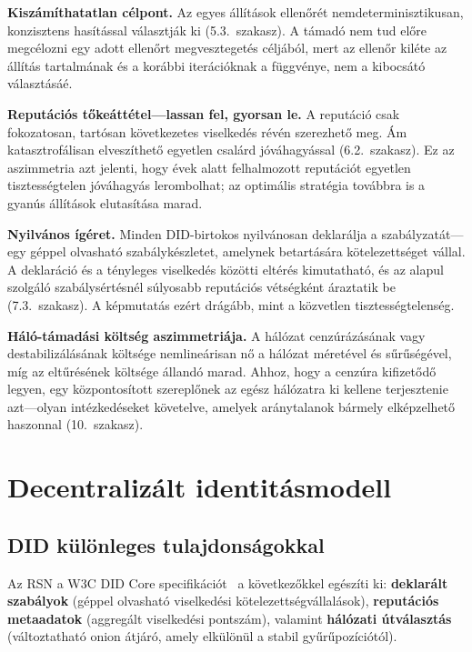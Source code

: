 \documentclass[11pt,a4paper,twocolumn]{article}
\begin{document}
\textbf{Kiszámíthatatlan célpont.} Az egyes állítások ellenőrét nemdeterminisztikusan, konzisztens hasítással választják ki (5.3.~szakasz). A támadó nem tud előre megcélozni egy adott ellenőrt megvesztegetés céljából, mert az ellenőr kiléte az állítás tartalmának és a korábbi iterációknak a függvénye, nem a kibocsátó választásáé.

\textbf{Reputációs tőkeáttétel---lassan fel, gyorsan le.} A reputáció csak fokozatosan, tartósan következetes viselkedés révén szerezhető meg. Ám katasztrofálisan elveszíthető egyetlen csalárd jóváhagyással (6.2.~szakasz). Ez az aszimmetria azt jelenti, hogy évek alatt felhalmozott reputációt egyetlen tisztességtelen jóváhagyás lerombolhat; az optimális stratégia továbbra is a gyanús állítások elutasítása marad.

\textbf{Nyilvános ígéret.} Minden DID-birtokos nyilvánosan deklarálja a szabályzatát---egy géppel olvasható szabálykészletet, amelynek betartására kötelezettséget vállal. A deklaráció és a tényleges viselkedés közötti eltérés kimutatható, és az alapul szolgáló szabálysértésnél súlyosabb reputációs vétségként áraztatik be (7.3.~szakasz). A képmutatás ezért drágább, mint a közvetlen tisztességtelenség.

\textbf{Háló-támadási költség aszimmetriája.} A hálózat cenzúrázásának vagy destabilizálásának költsége nemlineárisan nő a hálózat méretével és sűrűségével, míg az eltűrésének költsége állandó marad. Ahhoz, hogy a cenzúra kifizetődő legyen, egy központosított szereplőnek az egész hálózatra ki kellene terjesztenie azt---olyan intézkedéseket követelve, amelyek aránytalanok bármely elképzelhető haszonnal (10.~szakasz).

\section{Decentralizált identitásmodell}

\subsection{DID különleges tulajdonságokkal}

Az RSN a W3C DID Core specifikációt~\cite{did2022} a következőkkel egészíti ki: \textbf{deklarált szabályok} (géppel olvasható viselkedési kötelezettségvállalások), \textbf{reputációs metaadatok} (aggregált viselkedési pontszám), valamint \textbf{hálózati útválasztás} (változtatható onion átjáró, amely elkülönül a stabil gyűrűpozíciótól).
\end{document}
